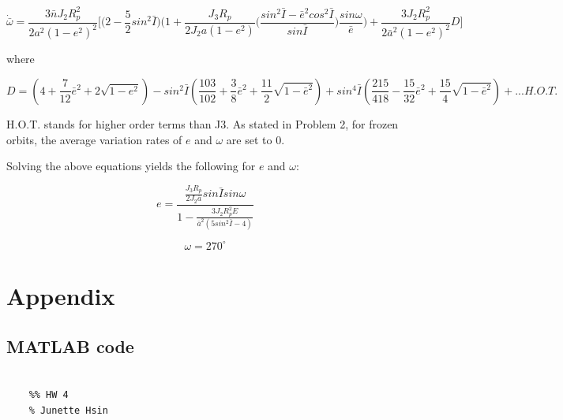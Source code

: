 \documentclass[conf]{new-aiaa}
\begin{document}
\begin{equation}
	\dot{\bar{\omega}} = \frac{3 \bar{n} J_2 R_p^2}{2 a^2 (1-e^2)^2} \Bigg[ \Big( 2 - \frac{5}{2} sin^2 \bar{I} \Big) \Big( 1 + \frac{J_3 R_p}{2 J_2 a(1-e^2)} \big( \frac{sin^2 \bar{I} - \bar{e}^2 cos^2 \bar{I}}{sin \bar{I}} \big) \frac{sin \omega}{\bar{e}} \Big) + \frac{3 J_2 R_p^2}{2 \bar{a}^2 ( 1 - e^2 )^2} D \Bigg]
\end{equation}

where 

\begin{equation}
	D = (4 + \frac{7}{12} \bar{e}^2 + 2 \sqrt{1 - e^2} ) - sin^2 \bar{I}( \frac{103}{102} + \frac{3}{8} \bar{e}^2 + \frac{11}{2} \sqrt{1 - \bar{e}^2} ) + sin^4 \bar{I}(\frac{215}{418} - \frac{15}{32} \bar{e}^2 + \frac{15}{4} \sqrt{1 - \bar{e}^2} ) + ... H.O.T. 
\end{equation}

H.O.T. stands for higher order terms than J3. As stated in Problem 2, for frozen orbits, the average variation rates of $e$ and $\omega$ are set to 0. 

Solving the above equations yields the following for $e$ and $\omega$: 

\begin{equation}
	e = \frac{ \frac{J_3 R_p}{ 2 J_2 \bar{a} } sin \bar{I} sin{\omega} }{ 1 - \frac{ 3 J_2 R_p^2 E }{ \bar{a}^2 ( 5 sin^2 \bar{I} - 4 ) } }
\end{equation}

\begin{equation}
	\omega = 270 ^\circ
\end{equation}

\section*{Appendix} 

\subsection*{MATLAB code} 

\begin{lstlisting}

    %% HW 4 
    % Junette Hsin 
    

    
	
\end{lstlisting}






% 
\end{document}
